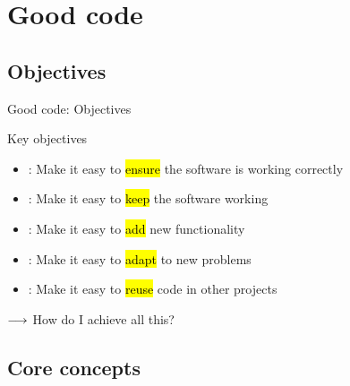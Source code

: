 \section{Good code}


\subsection{Objectives}


\begin{frame}{Good code: Objectives}
\begin{block}{Key objectives}{\relax}
	\begin{itemize}
		\item {}: Make it easy to \hl{ensure} the software is working correctly
		\item {}: Make it easy to \hl{keep} the software working 
		\item {}: Make it easy to \hl{add} new functionality
		\item {}: Make it easy to \hl{adapt} to new problems
		\item {}: Make it easy to \hl{reuse} code in other projects
	\end{itemize}
\end{block}

\bigskip
{\Large $\longrightarrow$ How do I achieve all this?}

\end{frame}

\subsection{Core concepts}


